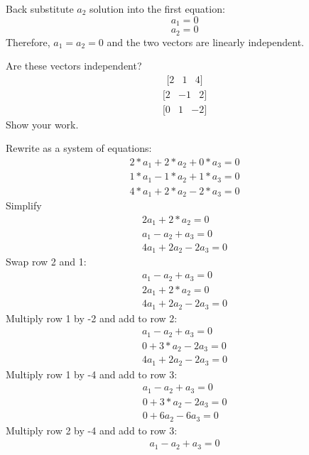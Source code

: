 Back substitute $a_2$ solution into the first equation:
$$a_1  = 0$$
$$a_2 = 0$$ 
Therefore, $a_1 = a_2 = 0$ and the two vectors are linearly independent.

\begin{Exercise}[title={Vector Independence}, label=vector_independence]
    Are these vectors independent? 
$$\begin{matrix}[2 & 1  & 4]\end{matrix}$$
$$\begin{matrix}[2  & -1  & 2]\end{matrix}$$ 
$$\begin{matrix}[0  & 1  & -2]\end{matrix}$$
Show your work.
\end{Exercise}

\begin{Answer}[ref=vector_independence]
    Rewrite as a system of equations:
        $$\begin{matrix}
			2*a_1 +2*a_2 + 0*a_3 = 0 \\
			1*a_1 - 1*a_2 + 1*a_3 = 0 \\
			4*a_1 + 2*a_2 - 2*a_3 = 0
		  \end{matrix} $$
	Simplify
		$$\begin{matrix}
			2a_1 +2*a_2 = 0 \\
			a_1 - a_2 + a_3 = 0 \\
			4a_1 + 2a_2 - 2a_3 = 0
		  \end{matrix} $$
	Swap row 2 and 1:
		$$\begin{matrix}
			a_1 - a_2 + a_3 = 0 \\
			2a_1 + 2*a_2 = 0 \\
			4a_1 + 2a_2 - 2a_3 = 0
		  \end{matrix} $$
	Multiply row 1 by -2 and add to row 2:
	   $$\begin{matrix}
			a_1 - a_2 + a_3 = 0 \\
			0 +  3*a_2 - 2a_3  = 0 \\
			4a_1 + 2a_2 - 2a_3 = 0
		  \end{matrix} $$
	Multiply row 1 by -4 and add to row 3:	
	    $$\begin{matrix}
			a_1 - a_2 + a_3 = 0 \\
			0 + 3*a_2 -2a_3 = 0 \\
			0 + 6a_2 - 6a_3 = 0
		  \end{matrix} $$
	Multiply row 2 by -4 and add to row 3:
	   $$\begin{matrix}
			a_1 - a_2 + a_3 = 0 \\

\end{matrix}$$
\end{Answer}
